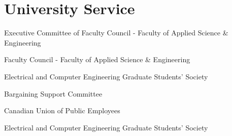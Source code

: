 \section{\sc University Service}

{
  Executive Committee of Faculty Council - Faculty of Applied Science \& Engineering
}

{
  Faculty Council - Faculty of Applied Science \& Engineering
}

{
  Electrical and Computer Engineering Graduate Students' Society
}

{
  Bargaining Support Committee
}

{
  Canadian Union of Public Employees
}

{
  Electrical and Computer Engineering Graduate Students' Society
}
